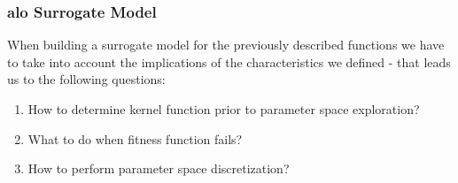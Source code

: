 \documentclass[12pt, runningheads,a4paper]{llncs}
\begin{document}




\subsubsection{\ac{alo} Surrogate Model}
\label{surrogatemodels}

When building a surrogate model for the previously described functions we have to take into account the implications of the characteristics we defined - that leads us to the following questions:
%
\begin{enumerate}
\item How to determine kernel function prior to parameter space exploration? 
\item What to do when fitness function fails? 
\item How to perform parameter space discretization? 
\end{enumerate}
\end{document}
